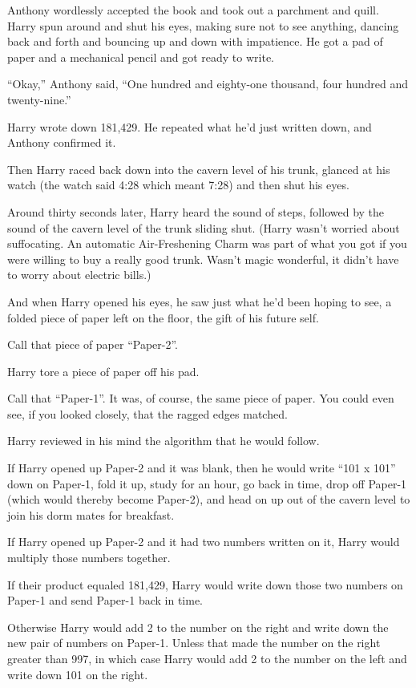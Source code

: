 Anthony wordlessly accepted the book and took out a parchment and quill.
Harry spun around and shut his eyes, making sure not to see anything,
dancing back and forth and bouncing up and down with impatience. He got
a pad of paper and a mechanical pencil and got ready to write.

``Okay,'' Anthony said, ``One hundred and eighty-one thousand, four
hundred and twenty-nine.''

Harry wrote down 181,429. He repeated what he'd just written down, and
Anthony confirmed it.

Then Harry raced back down into the cavern level of his trunk, glanced
at his watch (the watch said 4:28 which meant 7:28) and then shut his
eyes.

Around thirty seconds later, Harry heard the sound of steps, followed by
the sound of the cavern level of the trunk sliding shut. (Harry wasn't
worried about suffocating. An automatic Air-Freshening Charm was part of
what you got if you were willing to buy a really good trunk. Wasn't
magic wonderful, it didn't have to worry about electric bills.)

And when Harry opened his eyes, he saw just what he'd been hoping to
see, a folded piece of paper left on the floor, the gift of his future
self.

Call that piece of paper ``Paper-2''.

Harry tore a piece of paper off his pad.

Call that ``Paper-1''. It was, of course, the same piece of paper. You
could even see, if you looked closely, that the ragged edges matched.

Harry reviewed in his mind the algorithm that he would follow.

If Harry opened up Paper-2 and it was blank, then he would write ``101 x
101'' down on Paper-1, fold it up, study for an hour, go back in time,
drop off Paper-1 (which would thereby become Paper-2), and head on up
out of the cavern level to join his dorm mates for breakfast.

If Harry opened up Paper-2 and it had two numbers written on it, Harry
would multiply those numbers together.

If their product equaled 181,429, Harry would write down those two
numbers on Paper-1 and send Paper-1 back in time.

Otherwise Harry would add 2 to the number on the right and write down
the new pair of numbers on Paper-1. Unless that made the number on the
right greater than 997, in which case Harry would add 2 to the number on
the left and write down 101 on the right.

